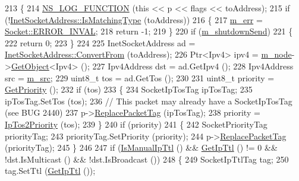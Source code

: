\begin{DoxyCode}
213 \{
214   \hyperlink{log-macros-disabled_8h_a90b90d5bad1f39cb1b64923ea94c0761}{NS\_LOG\_FUNCTION} (\textcolor{keyword}{this} << p << flags << toAddress);
215   \textcolor{keywordflow}{if} (!\hyperlink{classns3_1_1InetSocketAddress_a9426766e34e928ce5dbdbeb9563a10df}{InetSocketAddress::IsMatchingType} (toAddress))
216     \{
217       \hyperlink{classns3_1_1Ipv4RawSocketImpl_aae08c8798140ad6193ad2fc7ab1efbed}{m\_err} = \hyperlink{classns3_1_1Socket_ada1328c5ae0c28cb2a982caf8f6d6ccaa4b98dd50740861229f8e03bcc36d379b}{Socket::ERROR\_INVAL};
218       \textcolor{keywordflow}{return} -1;
219     \}
220   \textcolor{keywordflow}{if} (\hyperlink{classns3_1_1Ipv4RawSocketImpl_adc89037fdb02fa149e063882c499dfb8}{m\_shutdownSend})
221     \{
222       \textcolor{keywordflow}{return} 0;
223     \}
224 
225   InetSocketAddress ad = \hyperlink{classns3_1_1InetSocketAddress_ade776b1109e7b9a7be0b22ced49931e3}{InetSocketAddress::ConvertFrom} (toAddress);
226   Ptr<Ipv4> ipv4 = \hyperlink{classns3_1_1Ipv4RawSocketImpl_af8cdf6f27af43b69c0616b90e9f3af98}{m\_node}->\hyperlink{classns3_1_1Object_a13e18c00017096c8381eb651d5bd0783}{GetObject}<Ipv4> ();
227   Ipv4Address dst = ad.GetIpv4 ();
228   Ipv4Address src = \hyperlink{classns3_1_1Ipv4RawSocketImpl_a1881de88180f919a385b14db64b93932}{m\_src};
229   uint8\_t tos = ad.GetTos ();
230 
231   uint8\_t priority = \hyperlink{classns3_1_1Socket_a3e4788d61c0e841ccaa1c7fce6fda2c1}{GetPriority} ();
232   \textcolor{keywordflow}{if} (tos)
233     \{
234       SocketIpTosTag ipTosTag;
235       ipTosTag.SetTos (tos);
236       \textcolor{comment}{// This packet may already have a SocketIpTosTag (see BUG 2440)}
237       p->\hyperlink{classns3_1_1Packet_afb014ae9f4adddbfc51c64b085bfd405}{ReplacePacketTag} (ipTosTag);
238       priority = \hyperlink{classns3_1_1Socket_a81564620cc94d291f1dc5d79b2f13b4a}{IpTos2Priority} (tos);
239     \}
240   \textcolor{keywordflow}{if} (priority)
241     \{
242       SocketPriorityTag priorityTag;
243       priorityTag.SetPriority (priority);
244       p->\hyperlink{classns3_1_1Packet_afb014ae9f4adddbfc51c64b085bfd405}{ReplacePacketTag} (priorityTag);
245     \}
246 
247   \textcolor{keywordflow}{if} (\hyperlink{classns3_1_1Socket_afbbd0ecd7cda631cafc80eda33aa0b2c}{IsManualIpTtl} () && \hyperlink{classns3_1_1Socket_adf6420d12b8a0b6a20e46c37fe48830d}{GetIpTtl} () != 0 && !dst.IsMulticast () && !dst.IsBroadcast 
      ())
248     \{
249       SocketIpTtlTag tag;
250       tag.SetTtl (\hyperlink{classns3_1_1Socket_adf6420d12b8a0b6a20e46c37fe48830d}{GetIpTtl} ());

\end{DoxyCode}
